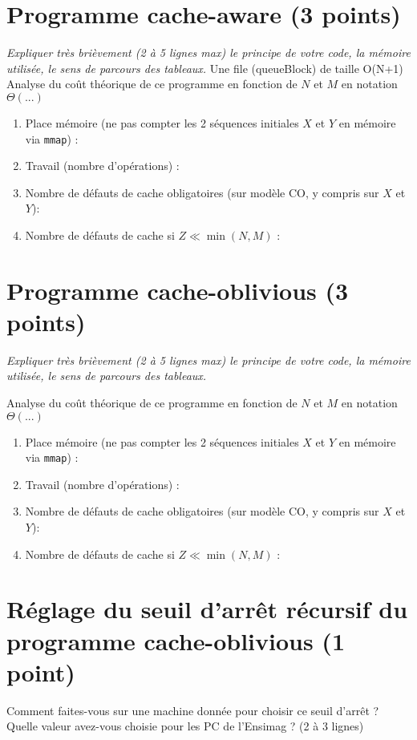 \documentclass[10pt,a4paper]{article}
\begin{document}
\section{Programme cache-aware (3 points)}
{\em Expliquer très brièvement (2 à 5 lignes max) le principe de votre code, la mémoire utilisée, le sens de parcours des tableaux.}
\vspace*{1.0cm}
Une file (queueBlock) de taille O(N+1)
Analyse du coût théorique de ce programme en fonction de $N$ et $M$ en notation $\Theta(...)$
\begin{enumerate}
  \item Place mémoire (ne pas compter les 2 séquences initiales $X$ et $Y$ en mémoire via {\tt mmap}) :
  \item Travail (nombre d'opérations) :
  \item Nombre de défauts de cache obligatoires (sur modèle CO, y compris sur $X$ et $Y$):
  \item Nombre de défauts de cache si $Z \ll \min(N,M)$ :
\end{enumerate}

\section{Programme cache-oblivious (3 points)}
{\em Expliquer très brièvement (2 à 5 lignes max) le principe de votre code, la mémoire utilisée, le sens de parcours des tableaux.}
\vspace*{1.0cm}

Analyse du coût théorique de ce programme en fonction de $N$ et $M$ en notation $\Theta(...)$
\begin{enumerate}
  \item Place mémoire (ne pas compter les 2 séquences initiales $X$ et $Y$ en mémoire via {\tt mmap}) :
  \item Travail (nombre d'opérations) :
  \item Nombre de défauts de cache obligatoires (sur modèle CO, y compris sur $X$ et $Y$):
  \item Nombre de défauts de cache si $Z \ll \min(N,M)$ :
\end{enumerate}

\section{Réglage du seuil d'arrêt récursif du programme cache-oblivious (1 point)}
Comment faites-vous sur une machine donnée pour choisir ce seuil d'arrêt ? Quelle valeur avez-vous choisie pour les PC de l'Ensimag ? (2 à 3 lignes)
\end{document}
